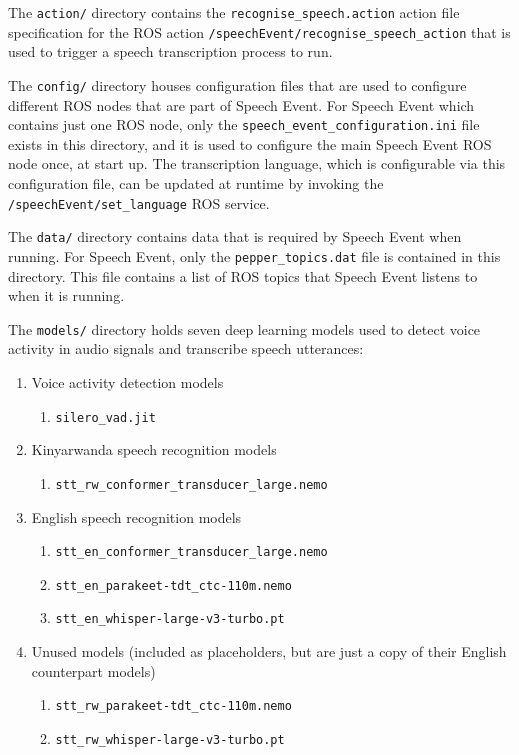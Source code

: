 \documentclass{CSSRforAfrica}
\begin{document}
The \texttt{action/} directory contains the \texttt{recognise\_speech.action} action file specification for the ROS action \texttt{/speechEvent/recognise\_speech\_action} that is used to trigger a speech transcription process to run.

The \texttt{config/} directory houses configuration files that are used to configure different ROS nodes that are part of Speech Event. For Speech Event which contains just one ROS node, only the \texttt{speech\_event\_configuration.ini} file exists in this directory, and it is used to configure the main Speech Event ROS node once, at start up. The transcription language, which is configurable via this configuration file, can be updated at runtime by invoking the \texttt{/speechEvent/set\_language} ROS service.

The \texttt{data/} directory contains data that is required by Speech Event when running. For Speech Event, only the \texttt{pepper\_topics.dat} file is contained in this directory. This file contains a list of ROS topics that Speech Event listens to when it is running.

The \texttt{models/} directory holds seven deep learning models used to detect voice activity in audio signals and transcribe speech utterances:

\begin{enumerate}
    \item Voice activity detection models
    \begin{enumerate}
        \item \texttt{silero\_vad.jit}
    \end{enumerate}
    \item Kinyarwanda speech recognition models
    \begin{enumerate}
        \item \texttt{stt\_rw\_conformer\_transducer\_large.nemo}
    \end{enumerate}
    \item English speech recognition models
    \begin{enumerate}
        \item \texttt{stt\_en\_conformer\_transducer\_large.nemo}
        \item \texttt{stt\_en\_parakeet-tdt\_ctc-110m.nemo}
        \item \texttt{stt\_en\_whisper-large-v3-turbo.pt}
    \end{enumerate}
    \item Unused models (included as placeholders, but are just a copy of their English counterpart models)
    \begin{enumerate}
        \item \texttt{stt\_rw\_parakeet-tdt\_ctc-110m.nemo}
        \item \texttt{stt\_rw\_whisper-large-v3-turbo.pt}
    \end{enumerate}
\end{enumerate}
\end{document}
